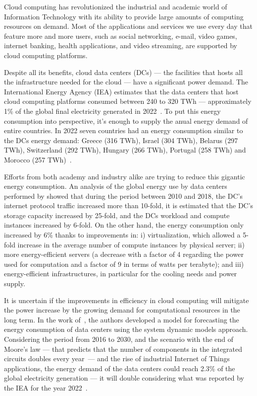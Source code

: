 Cloud computing has revolutionized the industrial and academic world of Information Technology with its ability to provide large amounts of computing resources on demand. Most of the applications and services we use every day that feature more and more users, such as social networking, e-mail, video games, internet banking, health applications, and video streaming, are supported by cloud computing platforms.

Despite all its benefits, cloud data centers (DCs) --- the facilities that hosts all the infrastructure needed for the cloud --- have a significant power demand. The International Energy Agency (IEA) estimates that the data centers  that host cloud computing platforms consumed between 240 to 320 TWh ---   approximately 1\% of the global final electricity generated in 2022~\cite{IEA_2022}. To put this energy consumption into perspective, it's enough to supply the anual energy demand of entire countries. In 2022 seven countries had an energy consumption similar to the DCs energy demand: Greece (316 TWh), Israel (304 TWh), Belarus (297 TWh), Switzerland (292 TWh), Hungary (266 TWh), Portugal (258 TWh) and Morocco (257 TWh)~\cite{owidenergy}.


Efforts from both academy and industry alike are trying to reduce this gigantic energy consumption. An analysis of the global energy use by data centers performed by \citet{masanet2020recalibrating} showed that during the period between 2010 and 2018, the DC's internet protocol traffic increased more than 10-fold, it is estimated that the DC's storage capacity increased by 25-fold, and the DCs workload and compute instances increased by 6-fold. On the other hand, the energy consumption only increased by 6\% thanks to improvements in: i) virtualization, which allowed a 5-fold increase in the average number of compute instances by physical server; ii) more energy-efficient servers (a decrease with a factor of 4 regarding the power used for computation and a factor of 9 in terms of watts per terabyte); and iii) energy-efficient infrastructures, in particular for the cooling needs and power supply.

It is uncertain if the improvements in efficiency in cloud computing will mitigate the power increase by the growing demand for computational resources in the long term. In the work of~\citet{koot2021usage}, the authors developed a model for forecasting the energy consumption of data centers using the system dynamic models approach. Considering the period from 2016 to 2030, and the scenario with the end of Moore's law --- that predicts that the number of components in the integrated circuits doubles every year~\cite{Mack_2011_moorelaw}---  and the rise of industrial Internet of Things applications, the energy demand of the data centers could reach 2.3\% of the global electricity generation --- it will double considering what was reported by the IEA for the year 2022~\cite{IEA_2022}.

